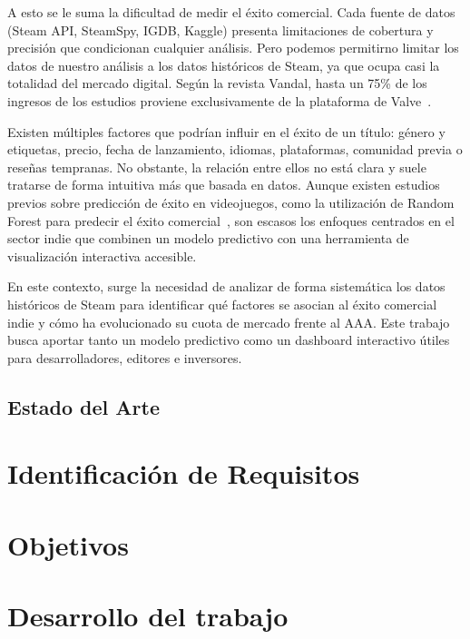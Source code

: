 \documentclass[11pt,a4paper,spanish]{book}
\numberwithin{equation}{chapter}
\numberwithin{figure}{chapter}
\begin{document}
\vspace{1em}
A esto se le suma la dificultad de medir el éxito comercial. Cada fuente de datos 
(Steam API, SteamSpy, IGDB, Kaggle) presenta limitaciones de cobertura y precisión 
que condicionan cualquier análisis. Pero podemos permitirno limitar los datos de 
nuestro análisis a los datos históricos de Steam, ya que ocupa casi la totalidad 
del mercado digital. Según la revista Vandal, hasta un 75\% de los ingresos 
de los estudios proviene exclusivamente de la plataforma de 
Valve~\cite{steam_monopolio}.

\vspace{1em}
Existen múltiples factores que podrían influir en el éxito de un título: género y 
etiquetas, precio, fecha de lanzamiento, idiomas, plataformas, comunidad previa o 
reseñas tempranas. No obstante, la relación entre ellos no está clara y suele 
tratarse de forma intuitiva más que basada en datos. Aunque existen estudios 
previos sobre predicción de éxito en videojuegos, como la utilización de Random 
Forest para predecir el éxito comercial~\cite{vivero2025}, son escasos los enfoques 
centrados en el sector indie que combinen un modelo predictivo con una herramienta 
de visualización interactiva accesible.

\vspace{1em}
En este contexto, surge la necesidad de analizar de forma sistemática los datos 
históricos de Steam para identificar qué factores se asocian al éxito comercial 
indie y cómo ha evolucionado su cuota de mercado frente al AAA. Este trabajo busca 
aportar tanto un modelo predictivo como un dashboard interactivo útiles para 
desarrolladores, editores e inversores.

\section{Estado del Arte}

\chapter{Identificación de Requisitos}

\chapter{Objetivos}

\chapter{Desarrollo del trabajo}
\end{document}
